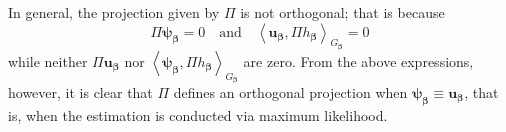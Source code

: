 \documentclass[11pt]{article}
\newcommand{\vect}[1]{\boldsymbol{#1}}
\newcommand{\inner}[1]{\left\langle #1 \right\rangle}
\begin{document}
In general, the projection given by $\Pi$ is not orthogonal; that is because $$\Pi \vect{\psi}_{\vect{\beta}}=0 \quad \text{and}\quad\inner{\vect{u}_{\vect{\beta}},\Pi h_{\vect{\beta}}}_{G_{\vect{\beta}}}=0$$ 
while neither $\Pi \vect{u}_{\vect{\beta}}$ nor $\inner{\vect{\psi}_{\vect{\beta}},\Pi h_{\vect{\beta}}}_{G_{\vect{\beta}}}$ are zero.
From the above expressions, however, it is clear that $\Pi$ defines an orthogonal projection when $\vect{\psi}_{\vect{\beta}}\equiv \vect{u}_{\vect{\beta}}$, that is, when the estimation is conducted via maximum likelihood. 
\end{document}
